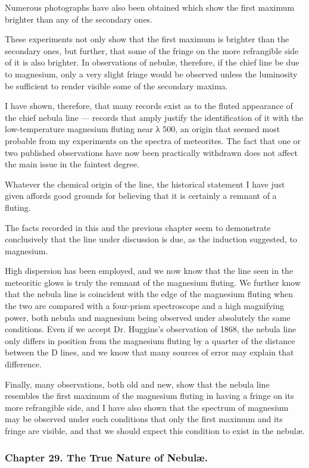 \documentclass[a4paper, 12pt, oneside, polutonikogreek, english]{article}
\begin{document}
Numerous photographs have also been obtained which show the first maximum brighter than any of the secondary ones.

These experiments not only show that the first maximum is brighter than the secondary ones, but further, that some of the fringe on the more refrangible side of it is also brighter. In observations of nebulæ, therefore, if the chief line be due to magnesium, only a very slight fringe would be observed unless the luminosity be sufficient to render visible some of the secondary maxima.

I have shown, therefore, that many records exist as to the fluted appearance of the chief nebula line --- records that amply justify the identification of it with the low-temperature magnesium fluting near λ 500, an origin that seemed most probable from my experiments on the spectra of meteorites. The fact that one or two published observations have now been practically withdrawn does not affect the main issue in the faintest degree.

Whatever the chemical origin of the line, the historical statement I have just given affords good grounds for believing that it is certainly a remnant of a fluting.

The facts recorded in this and the previous chapter seem to demonstrate conclusively that the line under discussion is due, as the induction suggested, to magnesium.

High dispersion has been employed, and we now know that the line seen in the meteoritic glows is truly the remnant of the magnesium fluting. We further know that the nebula line is coincident with the edge of the magnesium fluting when the two are compared with a four-prism spectroscope and a high magnifying power, both nebula and magnesium being observed under absolutely the same conditions. Even if we accept Dr. Huggins's observation of 1868, the nebula line only differs in position from the magnesium fluting by a quarter of the distance between the D lines, and we know that many sources of error may explain that difference.

Finally, many observations, both old and new, show that the nebula line resembles the first maximum of the magnesium fluting in having a fringe on its more refrangible side, and I have also shown that the spectrum of magnesium may be observed under such conditions that only the first maximum and its fringe are visible, and that we should expect this condition to exist in the nebulæ.
\clearpage
\subsubsection{Chapter 29. The True Nature of Nebulæ.}
\end{document}
